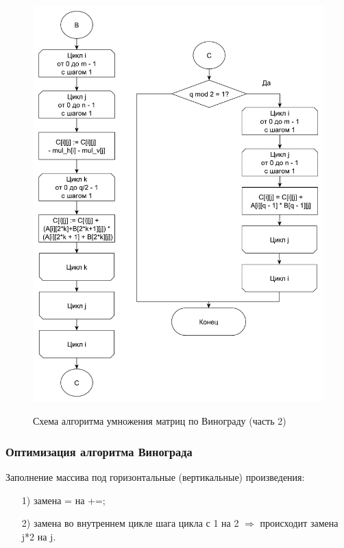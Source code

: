 \documentclass[a4paper,14pt]{article}
\begin{document}
        \begin{figure}[h!]
        	\begin{center}
        		{\includegraphics[scale = 0.5]{schema07.pdf}}
        		\caption{Схема алгоритма умножения матриц по Винограду (часть 2)}
        		\label{fig:schema_mult_v_2}
        	\end{center}
        \end{figure}
        
        \subsubsection{Оптимизация алгоритма Винограда}
        		Заполнение массива под горизонтальные (вертикальные) произведения:
	\begin{enumerate} 
	\item[1)] замена = на +=;
	\item[2)] замена во внутреннем цикле шага цикла с 1 на 2 $\Rightarrow$ происходит замена j*2 на j.
	\end{enumerate}
	
\end{document}
